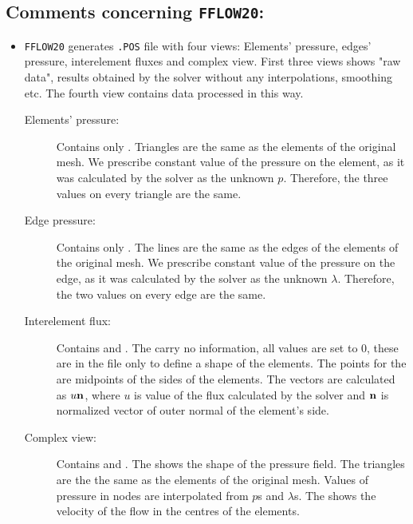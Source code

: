 \subsection*{Comments concerning {\tt FFLOW20}:}
\begin{itemize}
  \item {\tt FFLOW20} generates {\tt .POS} file with four views: Elements'
     pressure, edges' pressure, interelement fluxes and complex view. First
     three views shows "raw data", results obtained by the solver without any
     interpolations, smoothing etc. The fourth view contains data processed in
     this way.
     \begin{description}
       \item[Elements' pressure:] Contains only .
         Triangles are the same as the elements of the original mesh. We
         prescribe constant value of the pressure on the element, as it was
         calculated by the solver as the unknown $p$. Therefore, the three
         values on every triangle are the same.
       \item[Edge pressure:]  Contains only . The
         lines are the same as the edges of the elements of the original
         mesh. We prescribe constant value of the pressure on the edge, as it
         was calculated by the solver as the unknown $\lambda$. Therefore, the
         two values on every edge are the same.
       \item[Interelement flux:] Contains  and
         . The 
         carry no information, all values are set to 0, these are in the file
         only to define a shape of the elements. The points for the
          are midpoints of the sides of the
         elements. The vectors are calculated as $u{\bf n}$, where $u$ is
         value of the flux calculated by the solver and ${\bf n}$ is
         normalized vector of outer normal of the element's side.
       \item[Complex view:] Contains  and
         . The  shows the
         shape of the pressure field. The triangles are the the same as the
         elements of the original mesh. Values of pressure in nodes are
         interpolated from $p$s and $\lambda$s. The 
         shows the velocity of the flow in the centres of the elements.
     \end{description}
\end{itemize}

